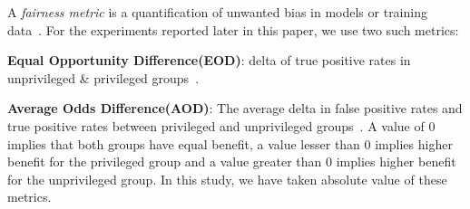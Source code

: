 A \textit{fairness metric} is a quantification of unwanted bias in models or training data~\cite{IBM}. 
For the experiments reported later in this paper, we use two such metrics:
\bi
\item \textbf{Equal Opportunity Difference(EOD)}:    delta of true positive rates in unprivileged \& privileged groups~\cite{IBM}. 
\item \textbf{Average Odds Difference(AOD)}: The average delta in false positive rates and true positive rates between privileged and unprivileged groups~\cite{IBM}.
\ei
A value of 0 implies that both groups have equal benefit, a value lesser than 0 implies higher benefit for the privileged group and a value greater than 0 implies higher benefit for the unprivileged group. In this study, we have taken absolute value of these metrics. 


  


